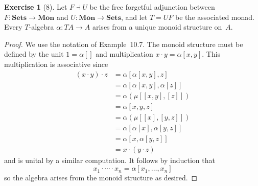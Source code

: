 \documentclass[letterpaper,12pt]{article}
\newcommand{\adj}{\dashv}
\newcommand{\mult}{\cdot}
\newcommand{\cat}[1]{\mathbf{#1}}
\newcommand{\2}{\cat{2}}
\newcommand{\Sets}{\cat{Sets}}
\newcommand{\Mon}{\cat{Mon}}
\theoremstyle{definition}
\newtheorem*{exer}{Exercise}
\theoremstyle{remark}
\theoremstyle{direction}
\begin{document}
\begin{exer}[8]
Let \(F\adj U\) be the free forgetful adjunction between \(F:\Sets\to\Mon\) and \(U:\Mon\to\Sets\), and let \(T=UF\) be the associated monad. Every \(T\)-algebra \(\alpha:TA\to A\) arises from a unique monoid structure on~\(A\).
\end{exer}
\begin{proof}
We use the notation of Example~10.7. The monoid structure must be defined by the unit \(1=\alpha[]\) and multiplication \(x\mult y=\alpha[x,y]\). This multiplication is associative since
\begin{align*}
(x\mult y)\mult z&=\alpha[\alpha[x,y],z]\\
	&=\alpha[\alpha[x,y],\alpha[z]]\\
	&=\alpha(\mu[[x,y],[z]])\\
	&=\alpha[x,y,z]\\
	&=\alpha(\mu[[x],[y,z]])\\
	&=\alpha[\alpha[x],\alpha[y,z]]\\
	&=\alpha[x,\alpha[y,z]]\\
	&=x\mult(y\mult z)
\end{align*}
and is unital by a similar computation. It follows by induction that
\[x_1\mult\cdots\mult x_n=\alpha[x_1,\ldots,x_n]\]
so the algebra arises from the monoid structure as desired.
\end{proof}
\end{document}
